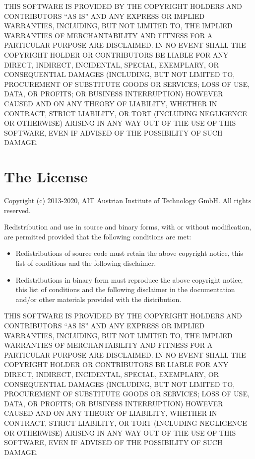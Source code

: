 THIS SOFTWARE IS PROVIDED BY THE COPYRIGHT HOLDERS AND CONTRIBUTORS ``AS
IS'' AND ANY EXPRESS OR IMPLIED WARRANTIES, INCLUDING, BUT NOT LIMITED
TO, THE IMPLIED WARRANTIES OF MERCHANTABILITY AND FITNESS FOR A
PARTICULAR PURPOSE ARE DISCLAIMED. IN NO EVENT SHALL THE COPYRIGHT
HOLDER OR CONTRIBUTORS BE LIABLE FOR ANY DIRECT, INDIRECT, INCIDENTAL,
SPECIAL, EXEMPLARY, OR CONSEQUENTIAL DAMAGES (INCLUDING, BUT NOT LIMITED
TO, PROCUREMENT OF SUBSTITUTE GOODS OR SERVICES; LOSS OF USE, DATA, OR
PROFITS; OR BUSINESS INTERRUPTION) HOWEVER CAUSED AND ON ANY THEORY OF
LIABILITY, WHETHER IN CONTRACT, STRICT LIABILITY, OR TORT (INCLUDING
NEGLIGENCE OR OTHERWISE) ARISING IN ANY WAY OUT OF THE USE OF THIS
SOFTWARE, EVEN IF ADVISED OF THE POSSIBILITY OF SUCH DAMAGE.


\section{The \fmipp License}
\label{fmipp_license}

Copyright (c) 2013-2020, AIT Austrian Institute of Technology GmbH. All
rights reserved.

Redistribution and use in source and binary forms, with or without
modification, are permitted provided that the following conditions are
met:

\begin{itemize}
\itemsep1pt\parskip0pt
\item
  Redistributions of source code must retain the above copyright notice,
  this list of conditions and the following disclaimer.
\item
  Redistributions in binary form must reproduce the above copyright
  notice, this list of conditions and the following disclaimer in the
  documentation and/or other materials provided with the distribution.
\end{itemize}

THIS SOFTWARE IS PROVIDED BY THE COPYRIGHT HOLDERS AND CONTRIBUTORS ``AS
IS'' AND ANY EXPRESS OR IMPLIED WARRANTIES, INCLUDING, BUT NOT LIMITED
TO, THE IMPLIED WARRANTIES OF MERCHANTABILITY AND FITNESS FOR A
PARTICULAR PURPOSE ARE DISCLAIMED. IN NO EVENT SHALL THE COPYRIGHT
HOLDER OR CONTRIBUTORS BE LIABLE FOR ANY DIRECT, INDIRECT, INCIDENTAL,
SPECIAL, EXEMPLARY, OR CONSEQUENTIAL DAMAGES (INCLUDING, BUT NOT LIMITED
TO, PROCUREMENT OF SUBSTITUTE GOODS OR SERVICES; LOSS OF USE, DATA, OR
PROFITS; OR BUSINESS INTERRUPTION) HOWEVER CAUSED AND ON ANY THEORY OF
LIABILITY, WHETHER IN CONTRACT, STRICT LIABILITY, OR TORT (INCLUDING
NEGLIGENCE OR OTHERWISE) ARISING IN ANY WAY OUT OF THE USE OF THIS
SOFTWARE, EVEN IF ADVISED OF THE POSSIBILITY OF SUCH DAMAGE.

